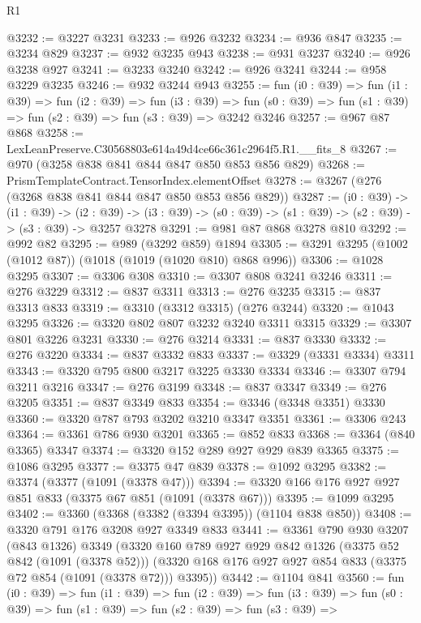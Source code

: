 \begin{lexlean}{R1}
\begin{coremodule}
@3232 := @3227 @3231
@3233 := @926 @3232
@3234 := @936 @847
@3235 := @3234 @829
@3237 := @932 @3235 @943
@3238 := @931 @3237
@3240 := @926 @3238 @927
@3241 := @3233 @3240
@3242 := @926 @3241
@3244 := @958 @3229 @3235
@3246 := @932 @3244 @943
@3255 := fun (i0 : @39) =>
  fun (i1 : @39) =>
  fun (i2 : @39) =>
  fun (i3 : @39) =>
  fun (s0 : @39) => fun (s1 : @39) => fun (s2 : @39) => fun (s3 : @39) => @3242 @3246
@3257 := @967 @87 @868
@3258 := LexLeanPreserve.C30568803e614a49d4ce66c361c2964f5.R1.__fits_8
@3267 := @970 (@3258 @838 @841 @844 @847 @850 @853 @856 @829)
@3268 := PrismTemplateContract.TensorIndex.elementOffset
@3278 := @3267 (@276 (@3268 @838 @841 @844 @847 @850 @853 @856 @829))
@3287 := (i0 : @39) ->
  (i1 : @39) ->
  (i2 : @39) -> (i3 : @39) -> (s0 : @39) -> (s1 : @39) -> (s2 : @39) -> (s3 : @39) -> @3257 @3278
@3291 := @981 @87 @868 @3278 @810
@3292 := @992 @82
@3295 := @989 (@3292 @859) @1894
@3305 := @3291 @3295 (@1002 (@1012 @87)) (@1018 (@1019 (@1020 @810) @868 @996))
@3306 := @1028 @3295
@3307 := @3306 @308
@3310 := @3307 @808 @3241 @3246
@3311 := @276 @3229
@3312 := @837 @3311
@3313 := @276 @3235
@3315 := @837 @3313 @833
@3319 := @3310 (@3312 @3315) (@276 @3244)
@3320 := @1043 @3295
@3326 := @3320 @802 @807 @3232 @3240 @3311 @3315
@3329 := @3307 @801 @3226 @3231
@3330 := @276 @3214
@3331 := @837 @3330
@3332 := @276 @3220
@3334 := @837 @3332 @833
@3337 := @3329 (@3331 @3334) @3311
@3343 := @3320 @795 @800 @3217 @3225 @3330 @3334
@3346 := @3307 @794 @3211 @3216
@3347 := @276 @3199
@3348 := @837 @3347
@3349 := @276 @3205
@3351 := @837 @3349 @833
@3354 := @3346 (@3348 @3351) @3330
@3360 := @3320 @787 @793 @3202 @3210 @3347 @3351
@3361 := @3306 @243
@3364 := @3361 @786 @930 @3201
@3365 := @852 @833
@3368 := @3364 (@840 @3365) @3347
@3374 := @3320 @152 @289 @927 @929 @839 @3365
@3375 := @1086 @3295
@3377 := @3375 @47 @839
@3378 := @1092 @3295
@3382 := @3374 (@3377 (@1091 (@3378 @47)))
@3394 := @3320 @166 @176 @927 @927 @851 @833 (@3375 @67 @851 (@1091 (@3378 @67)))
@3395 := @1099 @3295
@3402 := @3360 (@3368 (@3382 (@3394 @3395)) (@1104 @838 @850))
@3408 := @3320 @791 @176 @3208 @927 @3349 @833
@3441 := @3361
    @790
    @930
    @3207
    (@843 @1326)
    @3349
    (@3320
      @160
      @789
      @927
      @929
      @842
      @1326
      (@3375 @52 @842 (@1091 (@3378 @52)))
      (@3320 @168 @176 @927 @927 @854 @833 (@3375 @72 @854 (@1091 (@3378 @72))) @3395))
@3442 := @1104 @841
@3560 := fun (i0 : @39) =>
  fun (i1 : @39) =>
  fun (i2 : @39) =>
  fun (i3 : @39) =>
  fun (s0 : @39) =>
  fun (s1 : @39) =>
  fun (s2 : @39) =>
  fun (s3 : @39) =>

\end{coremodule}
\end{lexlean}
